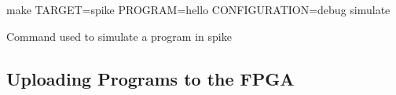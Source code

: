 	\begin{listing}[h!tbp]
		\begin{bashsource}
			make TARGET=spike PROGRAM=hello CONFIGURATION=debug simulate
		\end{bashsource}
		\caption{Command used to simulate a program in \gls{spike}}
		\label{lst:simulate_in_spike}
	\end{listing}
	
\subsection{Uploading Programs to the FPGA}\label{sec:Upload_Programs_to_Flashed_FPGA}

